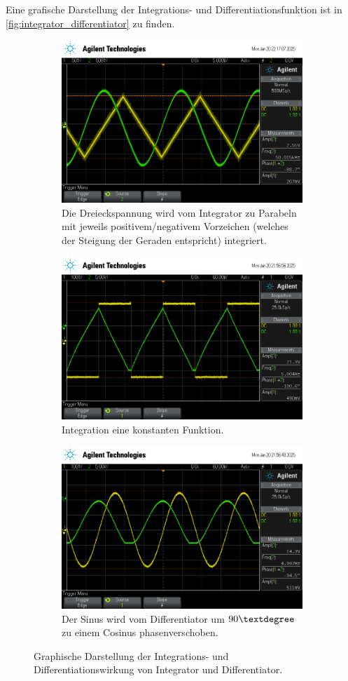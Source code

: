 Eine grafische Darstellung der Integrations- und Differentiationsfunktion ist in \autoref{fig:integrator_differentiator} zu finden.
\begin{figure}
    \centering
    \begin{subfigure}{\textwidth}
        \centering
        \includegraphics[width=0.7\linewidth]{data/scope_7.png}
        \caption{Die Dreieckspannung wird vom Integrator zu Parabeln mit jeweils positivem/negativem Vorzeichen (welches der Steigung der Geraden entspricht) integriert.}
    \end{subfigure}
    \begin{subfigure}{\textwidth}
        \centering
        \includegraphics[width=0.7\linewidth]{data/scope_3.png}
        \caption{Integration eine konstanten Funktion.}
    \end{subfigure}
    \begin{subfigure}{\textwidth}
        \centering
        \includegraphics[width=0.7\linewidth]{data/scope_2.png}
        \caption{Der Sinus wird vom Differentiator um $90\textdegree$ zu einem Cosinus phasenverschoben.}
        \label{fig:generator_gedampft_plot}
    \end{subfigure}
    \caption{Graphische Darstellung der Integrations- und Differentiationswirkung von Integrator und Differentiator.}
    \label{fig:integrator_differentiator}
\end{figure}


